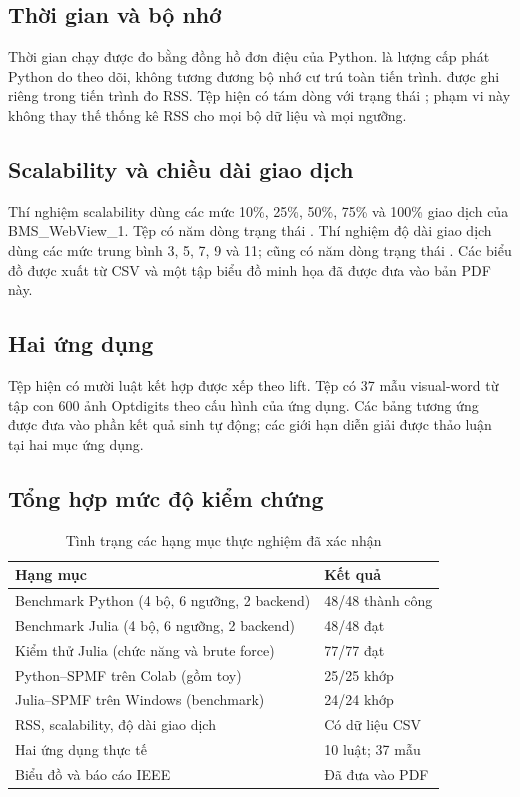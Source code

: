 \subsection{Thời gian và bộ nhớ}
Thời gian chạy được đo bằng đồng hồ đơn điệu của Python.  là lượng cấp phát Python do  theo dõi, không tương đương bộ nhớ cư trú toàn tiến trình.  được ghi riêng trong tiến trình đo RSS. Tệp  hiện có tám dòng với trạng thái ; phạm vi này không thay thế thống kê RSS cho mọi bộ dữ liệu và mọi ngưỡng.

\subsection{Scalability và chiều dài giao dịch}
Thí nghiệm scalability dùng các mức 10\%, 25\%, 50\%, 75\% và 100\% giao dịch của BMS\_WebView\_1. Tệp  có năm dòng trạng thái . Thí nghiệm độ dài giao dịch dùng các mức trung bình 3, 5, 7, 9 và 11;  cũng có năm dòng trạng thái . Các biểu đồ được xuất từ CSV và một tập biểu đồ minh họa đã được đưa vào bản PDF này.

\subsection{Hai ứng dụng}
Tệp  hiện có mười luật kết hợp được xếp theo lift. Tệp  có 37 mẫu visual-word từ tập con 600 ảnh Optdigits theo cấu hình của ứng dụng. Các bảng tương ứng được đưa vào phần kết quả sinh tự động; các giới hạn diễn giải được thảo luận tại hai mục ứng dụng.

\subsection{Tổng hợp mức độ kiểm chứng}
\begin{table}[t]
\centering
\caption{Tình trạng các hạng mục thực nghiệm đã xác nhận}\label{tab:accept}
\begin{tabular}{@{}p{}p{}@{}}\toprule
Hạng mục & Kết quả \\ \midrule
Benchmark Python (4 bộ, 6 ngưỡng, 2 backend) & 48/48 thành công\\
Benchmark Julia (4 bộ, 6 ngưỡng, 2 backend) & 48/48 đạt\\
Kiểm thử Julia (chức năng và brute force) & 77/77 đạt\\
Python--SPMF trên Colab (gồm toy) & 25/25 khớp\\
Julia--SPMF trên Windows (benchmark) & 24/24 khớp\\
RSS, scalability, độ dài giao dịch & Có dữ liệu CSV\\
Hai ứng dụng thực tế & 10 luật; 37 mẫu\\
Biểu đồ và báo cáo IEEE & Đã đưa vào PDF\\
\bottomrule\end{tabular}
\end{table}


